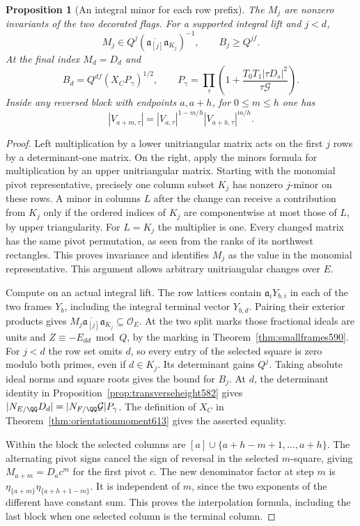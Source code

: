 \documentclass[a4paper,11pt]{article}
\newtheorem{proposition}{Proposition}[section]
\theoremstyle{definition}
\theoremstyle{remark}
\numberwithin{equation}{section}
\begin{document}
\begin{proposition}[An integral minor for each row prefix]
\leavevmode\label{prop:pivotflags619}
The \(M_j\) are nonzero invariants of the two decorated flags.
For a supported integral lift and \(j<d\),
\[
   M_j\in Q^j(\overline{\mathfrak a_{[j]}}\mathfrak a_{K_j})^{-1},
   \qquad B_j\ge Q^{jf}.
\]
At the final index \(M_d=D_d\) and
\[
   B_d=Q^{df}(X_C P_\gamma)^{1/2},
   \qquad P_\gamma=\prod_\tau
       \left(1+\frac{T_0T_1|\tau D_s|^2}{\tau\mathcal G}\right).
\]
Inside any reversed block with endpoints \(a,a+h\), for
\(0\le m\le h\) one has
\[
 |V_{a+m,\tau}|=
 |V_{a,\tau}|^{1-m/h}|V_{a+h,\tau}|^{m/h}.
\]
\end{proposition}
\begin{proof}
Left multiplication by a lower unitriangular matrix acts on the
first \(j\) rows by a determinant-one matrix. On the right, apply
the minors formula for multiplication by an upper unitriangular
matrix. Starting with the monomial pivot representative, precisely
one column subset \(K_j\) has nonzero \(j\)-minor on these rows.
A minor in columns \(L\) after the change can receive a contribution
from \(K_j\) only if the ordered indices of \(K_j\) are componentwise
at most those of \(L\), by upper triangularity. For \(L=K_j\) the
multiplier is one. Every changed matrix has the same pivot permutation,
as seen from the ranks of its northwest rectangles. This proves
invariance and identifies \(M_j\) as the value in the monomial
representative. This argument allows arbitrary unitriangular changes
over \(E\).

Compute on an actual integral lift. The row lattices contain
\(\mathfrak a_iY_{b,i}\) in each of the two frames \(Y_b\), including
the integral terminal vector \(Y_{b,d}\). Pairing their exterior
products gives
\(M_j\overline{\mathfrak a_{[j]}}\mathfrak a_{K_j}
\subseteq\mathcal O_E\). At the two split marks those fractional
ideals are units and \(Z\equiv-E_{dd}\bmod Q\), by the marking in
Theorem~\ref{thm:smallframes590}. For \(j<d\) the row set omits \(d\),
so every entry of the selected square is zero modulo both primes,
even if \(d\in K_j\). Its determinant gains \(Q^j\). Taking absolute
ideal norms and square roots gives the bound for \(B_j\).
At \(d\), the determinant identity in
Proposition~\ref{prop:transverseheight582} gives
\(|N_{E/\QQ}D_d|=|N_{F/\QQ}\mathcal G|P_\gamma\).
The definition of \(X_C\) in Theorem~\ref{thm:orientationmoment613}
gives the asserted equality.

Within the block the selected columns are
\([a]\cup\{a+h-m+1,\ldots,a+h\}\). The alternating pivot signs cancel
the sign of reversal in the selected \(m\)-square, giving
\(M_{a+m}=D_a c^m\) for the first pivot \(c\).
The new denominator factor at step \(m\) is
\(\eta_{\{a+m\}}\eta_{\{a+h+1-m\}}\). It is independent of \(m\),
since the two exponents of the different have constant sum.
This proves the interpolation formula, including the last block
when one selected column is the terminal column.
\end{proof}
\end{document}
